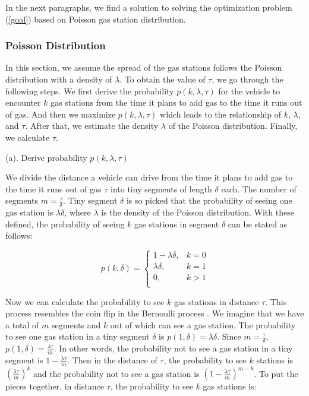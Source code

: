 \documentclass[conference]{IEEEtran}
\theoremstyle{definition}
\begin{document}
In the next paragraphs, we find a solution to solving the optimization problem (\ref{goal}) based on Poisson gas station distribution.

\subsubsection{Poisson Distribution}
In this section, we assume the spread of the gas stations follows the Poisson distribution with a density of $\lambda$. To obtain the value of $\tau$, we go through the following steps. We first derive the probability $p(k, \lambda, \tau)$ for the vehicle to encounter $k$ gas stations from the time it plans to add gas to the time it runs out of gas. And then we maximize $p(k, \lambda, \tau)$ which leads to the relationship of $k$, $\lambda$, and $\tau$. After that, we estimate the density $\lambda$ of the Poisson distribution. Finally, we  calculate $\tau$.

\noindent (a). Derive probability $p(k, \lambda, \tau)$

 We divide the distance a vehicle can drive from the time it plans to add gas to the time it runs out of gas $\tau$ into tiny segments of length $\delta$ each. The number of segments $m=\frac{\tau}{\delta}$. Tiny segment $\delta$ is so picked that the probability of seeing one gas station is $\lambda \delta$, where $\lambda$ is the density of the Poisson distribution. With these defined, the probability of seeing $k$ gas stations in segment $\delta$ can be stated as follows:

\[
p(k, \delta) =
\begin{cases}
1-\lambda \delta, & \text{$k = 0$}\\
\lambda \delta, &\text{$k = 1$}\\
0, &\text{$k > 1$}\\
\end{cases}
\]



Now we can calculate the probability to see $k$ gas stations in distance $\tau$. This process resembles the coin flip in the Bernoulli process \cite{Bernoulli}. We imagine that we have a total of $m$ segments and $k$ out of which can see a gas station. The probability to see one gas station in a tiny segment $\delta$ is $p(1,\delta)=\lambda \delta$. Since $m = \frac{\tau}{\delta}$, $p(1, \delta)= \frac{\lambda \tau}{m}$. In other words, the probability not to see a gas station in a tiny segment is $1-\frac{\lambda \tau}{m}$. Then in the distance of $\tau$, the probability to see $k$ stations is $(\frac{\lambda \tau}{m})^{k}$ and the probability not to see a gas station is $(1-\frac{\lambda \tau}{m})^{m-k}$. To put the pieces together, in  distance $\tau$, the probability to see $k$ gas stations is:
\end{document}
